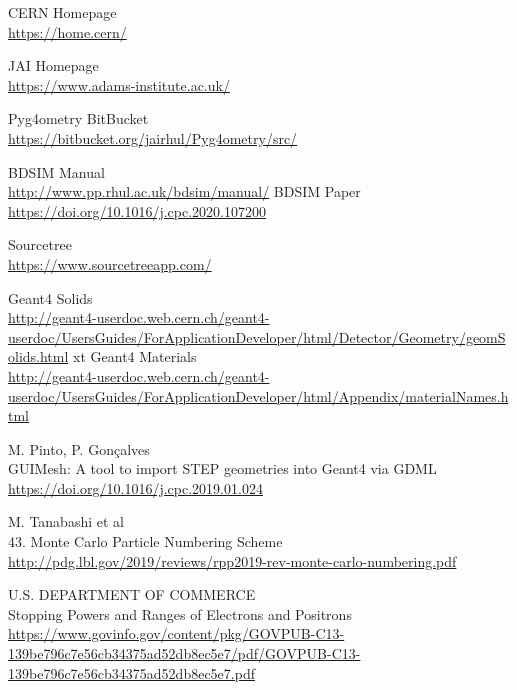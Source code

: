 \documentclass[12pt,a4paper]{article}
\begin{document}
\newpage
\begin{thebibliography}{1}

	CERN Homepage\\
	\url{https://home.cern/}
	
	JAI Homepage\\
	\url{https://www.adams-institute.ac.uk/}
	
	Pyg4ometry BitBucket\\
	\url{https://bitbucket.org/jairhul/Pyg4ometry/src/}
	
	\bibitem{}
		BDSIM Manual\\
		\url{http://www.pp.rhul.ac.uk/bdsim/manual/}
	\bibitem{}
		BDSIM Paper\\
		\url{https://doi.org/10.1016/j.cpc.2020.107200}
		
		Sourcetree\\
		\url{https://www.sourcetreeapp.com/}
		
		
		

		
	\bibitem{}
	Geant4 Solids\\
	\url{http://geant4-userdoc.web.cern.ch/geant4-userdoc/UsersGuides/ForApplicationDeveloper/html/Detector/Geometry/geomSolids.html}
	xt
	Geant4 Materials\\
	\url{http://geant4-userdoc.web.cern.ch/geant4-userdoc/UsersGuides/ForApplicationDeveloper/html/Appendix/materialNames.html}
	

	

	
	M. Pinto, P. Gon\c{c}alves\\
	GUIMesh: A tool to import STEP geometries into Geant4 via GDML\\
	\url{https://doi.org/10.1016/j.cpc.2019.01.024}
		
	M. Tanabashi et al\\
	43. Monte Carlo Particle Numbering Scheme\\
	\url{http://pdg.lbl.gov/2019/reviews/rpp2019-rev-monte-carlo-numbering.pdf}
	
	U.S. DEPARTMENT OF COMMERCE\\
	Stopping Powers and Ranges of
	Electrons and Positrons\\
	\url{https://www.govinfo.gov/content/pkg/GOVPUB-C13-139be796c7e56cb34375ad52db8ec5e7/pdf/GOVPUB-C13-139be796c7e56cb34375ad52db8ec5e7.pdf}


\end{thebibliography}
\end{document}
